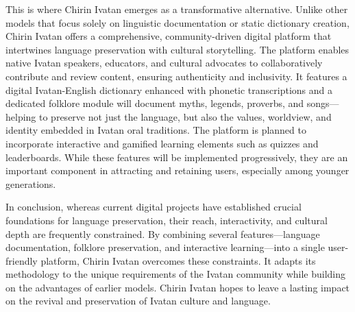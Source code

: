                 This is where Chirin Ivatan emerges as a transformative alternative. Unlike other models that focus solely on linguistic documentation or static dictionary creation, Chirin Ivatan offers a comprehensive, community-driven digital platform that intertwines language preservation with cultural storytelling. The platform enables native Ivatan speakers, educators, and cultural advocates to collaboratively contribute and review content, ensuring authenticity and inclusivity. It features a digital Ivatan-English dictionary enhanced with phonetic transcriptions and a dedicated folklore module will document myths, legends, proverbs, and songs—helping to preserve not just the language, but also the values, worldview, and identity embedded in Ivatan oral traditions. The platform is planned to incorporate interactive and gamified learning elements such as quizzes and leaderboards. While these features will be implemented progressively, they are an important component in attracting and retaining users, especially among younger generations. 

                In conclusion, whereas current digital projects have established crucial foundations for language preservation, their reach, interactivity, and cultural depth are frequently constrained. By combining several features—language documentation, folklore preservation, and interactive learning—into a single user-friendly platform, Chirin Ivatan overcomes these constraints. It adapts its methodology to the unique requirements of the Ivatan community while building on the advantages of earlier models. Chirin Ivatan hopes to leave a lasting impact on the revival and preservation of Ivatan culture and language.
